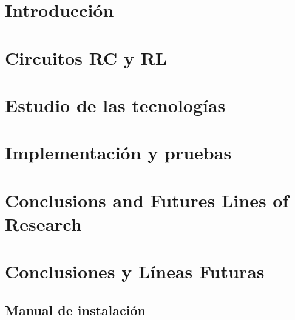 \documentclass[12pt, a4paper, twoside]{article}
\begin{document}


\clearpage
\setcounter{page}{1}



\newpage



\newpage



\tableofcontents

\section{Introducción}


\section{Circuitos RC y RL}


\section{Estudio de las tecnologías}


\section{Implementación y pruebas}


\section{Conclusions and Futures Lines of Research}


\section{Conclusiones y Líneas Futuras}



\printbibliography

\newpage

\begin{umaappendices}
  \section{Manual de instalación}
  
\end{umaappendices}
\end{document}
